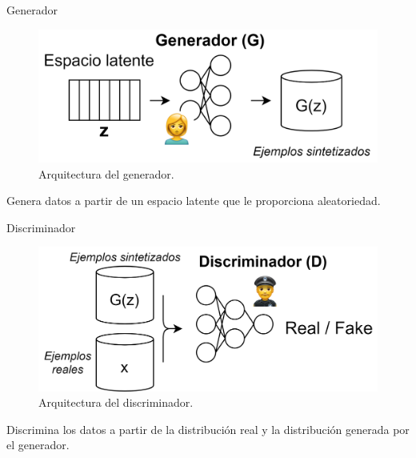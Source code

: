 \begin{frame}{Generador}
    
    \begin{figure}
        \centering
        \includegraphics[width=\textwidth]{Slides/figures/GAN/Generador.png}
        \caption{Arquitectura del generador.}
    \end{figure}
    
    \alert{Genera} datos a partir de un \alert{espacio latente} que le proporciona aleatoriedad.
    
\end{frame}

\begin{frame}{Discriminador}
    
    \begin{figure}
        \centering
        \includegraphics[width=\textwidth]{Slides/figures/GAN/Discriminador.png}
        \caption{Arquitectura del discriminador.}
    \end{figure}
    
    \alert{Discrimina} los datos a partir de la \alert{distribución real} y la \alert{distribución generada por el generador}.
    
\end{frame}

